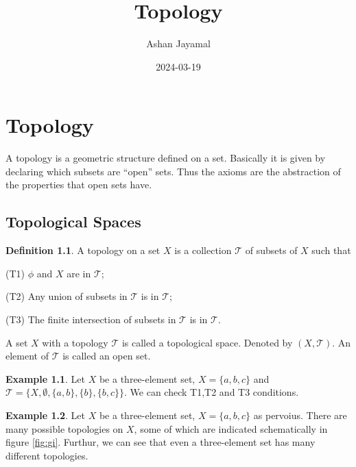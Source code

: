 \documentclass[
]{book}
\title{Topology}
\author{Ashan Jayamal}
\date{2024-03-19}
\theoremstyle{definition}
\newtheorem{definition}{Definition}[chapter]
\theoremstyle{definition}
\newtheorem{example}{Example}[chapter]
\theoremstyle{definition}
\theoremstyle{definition}
\theoremstyle{remark}
\begin{document}
\maketitle

{
\setcounter{tocdepth}{1}
\tableofcontents
}
\hypertarget{topology}{%
\chapter{Topology}\label{topology}}

A topology is a geometric structure defined on a set. Basically it is given by declaring which subsets are ``open'' sets. Thus the axioms are the abstraction of the properties that open sets have.

\hypertarget{topological-spaces}{%
\section{Topological Spaces}\label{topological-spaces}}

\begin{definition}
\protect\hypertarget{def:Top}{}\label{def:Top}A topology on a set \(X\) is a collection \(\mathcal{T}\) of subsets of \(X\) such that

(T1) \(\phi\) and \(X\) are in \(\mathcal{T}\);

(T2) Any union of subsets in \(\mathcal{T}\) is in \(\mathcal{T}\);

(T3) The finite intersection of subsets in \(\mathcal{T}\) is in \(\mathcal{T}\).
\end{definition}

A set \(X\) with a topology \(\mathcal{T}\) is called a topological space. Denoted by \((X,\mathcal{T})\). An element of \(\mathcal{T}\) is called an open set.

\begin{example}
\protect\hypertarget{exm:unnamed-chunk-1}{}\label{exm:unnamed-chunk-1}Let \(X\) be a three-element set, \(X = \{a, b, c\}\) and \(\mathcal{T}=\{X, \emptyset,\{a, b\}, \{b\}, \{b, c\}\}\). We can check T1,T2 and T3 conditions.
\end{example}

\begin{example}
\protect\hypertarget{exm:unnamed-chunk-2}{}\label{exm:unnamed-chunk-2}Let \(X\) be a three-element set, \(X = \{a, b, c\}\) as pervoius. There are many possible topologies on \(X\), some of which are indicated schematically in figure \ref{fig:gi}. Furthur, we can see that even a three-element set has many different topologies.
\end{example}
\end{document}
